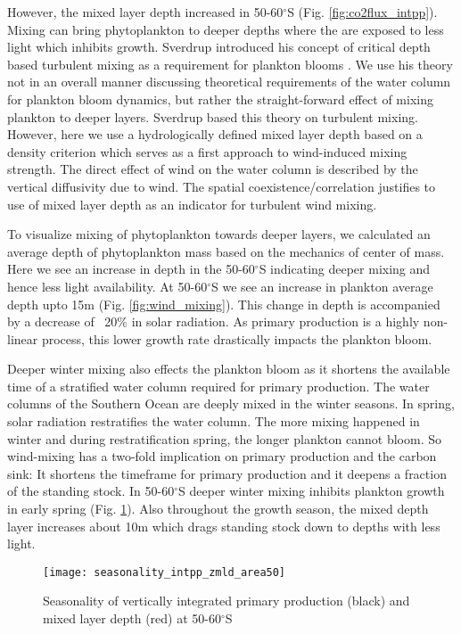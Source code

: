 \documentclass[12pt]{article}
\begin{document}
However, the mixed layer depth increased in 50-60$^\circ$S (Fig. \ref{fig:co2flux_intpp}). Mixing can bring phytoplankton to deeper depths where the are exposed to less light which inhibits growth. Sverdrup \citep{Sverdrup1953} introduced his concept of critical depth based turbulent mixing as a requirement for plankton blooms \citep{Franks2014}. We use his theory not in an overall manner discussing theoretical requirements of the water column for plankton bloom dynamics, but rather the straight-forward effect of mixing plankton to deeper layers. Sverdrup based this theory on turbulent mixing. However, here we use a hydrologically defined mixed layer depth based on a density criterion which serves as a first approach to wind-induced mixing strength. The direct effect of wind on the water column is described by the vertical diffusivity due to wind. The spatial coexistence/correlation justifies to use of mixed layer depth as an indicator for turbulent wind mixing.  



To visualize mixing of phytoplankton towards deeper layers, we calculated an average depth of phytoplankton mass based on the mechanics of center of mass. Here we see an increase in depth in the 50-60$^\circ$S indicating deeper mixing and hence less light availability. At 50-60$^\circ$S we see an increase in plankton average depth upto 15m (Fig. \ref{fig:wind_mixing}). This change in depth is accompanied by a decrease of ~20\% in solar radiation. As primary production is a highly non-linear process, this lower growth rate drastically impacts the plankton bloom.

Deeper winter mixing also effects the plankton bloom as it shortens the available time of a stratified water column required for primary production. The water columns of the Southern Ocean are deeply mixed in the winter seasons. In spring, solar radiation restratifies the water column. The more mixing happened in winter and during restratification spring, the longer plankton cannot bloom. So wind-mixing has a two-fold implication on primary production and the carbon sink: It shortens the timeframe for primary production and it deepens a fraction of the standing stock. In 50-60$^\circ$S deeper winter mixing inhibits plankton growth in early spring (Fig. \ref{fig:zmld_intpp_seasonality}). Also throughout the growth season, the mixed depth layer increases about 10m which drags standing stock down to depths with less light.

\begin{figure}[h]
\centering
\texttt{[image: seasonality\_intpp\_zmld\_area50]} %
\caption{Seasonality of vertically integrated primary production (black) and mixed layer depth (red) at 50-60$^\circ$S}
\label{fig:zmld_intpp_seasonality}
\end{figure}
\end{document}
